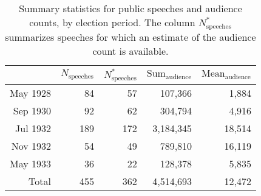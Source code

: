 \begin{table}[t!]
\centering
\caption{Summary statistics for public speeches and audience counts, by election period. The column $N^*_{\text{speeches}}$ summarizes speeches for which an estimate of the audience count is available.\label{tab:speechessumstats}} 
\begingroup\small
\begin{tabular}{rrrrr}
  \toprule
 & $N_{\text{speeches}}$ & $N^*_{\text{speeches}}$ & $\text{Sum}_{\text{audience}}$ & $\text{Mean}_{\text{audience}}$ \\ 
  \midrule
May 1928 & 84 & 57 & 107,366 & 1,884 \\ 
  Sep 1930 & 92 & 62 & 304,794 & 4,916 \\ 
  Jul 1932 & 189 & 172 & 3,184,345 & 18,514 \\ 
  Nov 1932 & 54 & 49 & 789,810 & 16,119 \\ 
  May 1933 & 36 & 22 & 128,378 & 5,835 \\ 
   \midrule
Total & 455 & 362 & 4,514,693 & 12,472 \\ 
   \bottomrule
\end{tabular}
\endgroup
\end{table}
